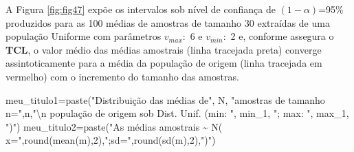 \documentclass[
]{book}
\newenvironment{Shaded}{\begin{snugshade}}{\end{snugshade}}
\newcommand{\DecValTok}[1]{\textcolor[rgb]{0.00,0.00,0.81}{#1}}
\newcommand{\FunctionTok}[1]{\textcolor[rgb]{0.00,0.00,0.00}{#1}}
\newcommand{\NormalTok}[1]{#1}
\newcommand{\OtherTok}[1]{\textcolor[rgb]{0.56,0.35,0.01}{#1}}
\newcommand{\SpecialCharTok}[1]{\textcolor[rgb]{0.00,0.00,0.00}{#1}}
\newcommand{\StringTok}[1]{\textcolor[rgb]{0.31,0.60,0.02}{#1}}
\begin{document}
\hfill\break

A Figura \ref{fig:fig47} expõe os intervalos sob nível de confiança de \((1-\alpha)\)=95\% produzidos para as 100 médias de amostras de tamanho 30 extraídas de uma população Uniforme com parâmetros \(v_{max}:\) 6 e \(v_{min}:\) 2 e, conforme assegura o \textbf{TCL}, o valor médio das médias amostrais (linha tracejada preta) converge assintoticamente para a média da população de origem (linha tracejada em vermelho) com o incremento do tamanho das amostras.

\hfill\break

\begin{Shaded}
\begin{Highlighting}[]
\NormalTok{meu\_titulo1}\OtherTok{=}\FunctionTok{paste}\NormalTok{(}\StringTok{"Distribuição das médias de"}\NormalTok{, N, }\StringTok{"amostras de tamanho n="}\NormalTok{,n,}\StringTok{"}\SpecialCharTok{\textbackslash{}n}\StringTok{ população de origem sob Dist. Unif. (min: "}\NormalTok{, min\_1, }\StringTok{"; max: "}\NormalTok{, max\_1, }\StringTok{")"}\NormalTok{)}
\NormalTok{meu\_titulo2}\OtherTok{=}\FunctionTok{paste}\NormalTok{(}\StringTok{"As médias amostrais \textasciitilde{} N( x="}\NormalTok{,}\FunctionTok{round}\NormalTok{(}\FunctionTok{mean}\NormalTok{(m),}\DecValTok{2}\NormalTok{),}\StringTok{";sd="}\NormalTok{,}\FunctionTok{round}\NormalTok{(}\FunctionTok{sd}\NormalTok{(m),}\DecValTok{2}\NormalTok{),}\StringTok{")"}\NormalTok{)}


\end{Highlighting}
\end{Shaded}
\end{document}
